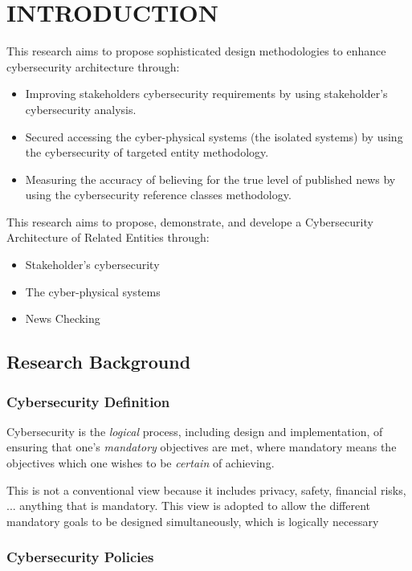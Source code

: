 \chapter{INTRODUCTION}

\if 
This research aims to propose sophisticated design methodologies to enhance cybersecurity architecture through:
\begin{itemize}
\item Improving stakeholders cybersecurity requirements by using stakeholder's cybersecurity analysis.
\item Secured accessing
the cyber-physical systems (the isolated systems) by using the cybersecurity of targeted entity methodology.
\item Measuring the accuracy of believing for the true level of published news by using the cybersecurity reference classes methodology. 
\end{itemize} \fi
\if
This research aims to propose,  demonstrate, and develope a Cybersecurity Architecture of Related Entities through:
\begin{itemize}
\item Stakeholder's cybersecurity  %
\item  The cyber-physical systems %
\item  News Checking %
\end{itemize}
\fi


\section{Research Background}
\subsection{Cybersecurity Definition}
Cybersecurity is the {\em logical} process, including design and implementation, of 
ensuring that one's {\em mandatory} objectives are met, where mandatory means the
objectives which one wishes to be {\em certain} of achieving.

This is not a conventional view because it includes privacy, safety, financial risks, ...
anything that is mandatory. This view is adopted to allow the different mandatory goals
to be designed simultaneously, which is logically necessary
\subsection{Cybersecurity Policies}
